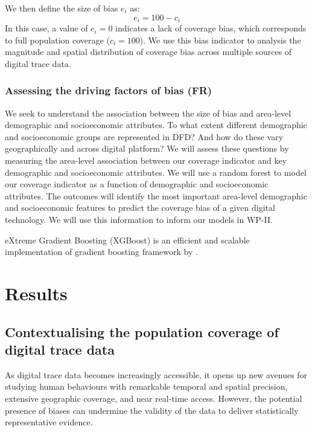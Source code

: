\documentclass[]{rsos}%
\begin{document}
We then define the size of bias \(e_i\) as: \begin{equation}
e_i = 100 - c_i
\end{equation} In this case, a value of \(e_i = 0\) indicates a lack of
coverage bias, which corresponds to full population coverage
(\(c_i = 100\)). We use this bias indicator to analysis the magnitude and
spatial distribution of coverage bias across multiple sources of digital
trace data.

\subsubsection{Assessing the driving factors of bias (FR)}\label{assessing-the-driving-factors-of-bias-fr}

We seek to understand the association between the size of bias and
area-level demographic and socioeconomic attributes. To what extent
different demographic and socioeconomic groups are represented in DFD?
And how do these vary geographically and across digital platform? We
will assess these questions by measuring the area-level association
between our coverage indicator and key demographic and socioeconomic
attributes. We will use a random forest to model our coverage indicator
as a function of demographic and socioeconomic attributes. The outcomes
will identify the most important area-level demographic and
socioeconomic features to predict the coverage bias of a given digital
technology. We will use this information to inform our models in WP-II.

eXtreme Gradient Boosting (XGBoost) is an efficient and scalable
implementation of gradient boosting framework by \citep{friedman2001, friedman2000}.

\section{Results}\label{results}

\subsection{Contextualising the population coverage of digital trace data}\label{contextualising-the-population-coverage-of-digital-trace-data}

As digital trace data becomes increasingly accessible, it opens up new
avenues for studying human behaviours with remarkable temporal and
spatial precision, extensive geographic coverage, and near real-time
access. However, the potential presence of
biases can undermine the validity of the data to deliver
statistically representative evidence.
\end{document}
